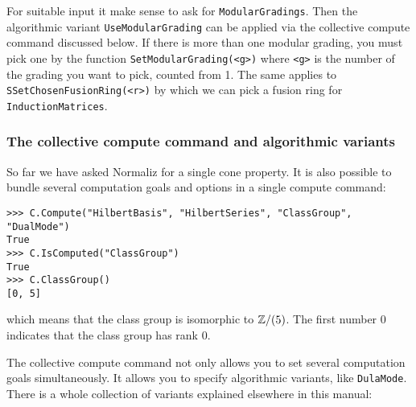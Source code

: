 \begin{small}
For suitable input it make sense to ask for \verb*|ModularGradings|. Then the algorithmic variant \verb*|UseModularGrading| can be applied via the collective compute command discussed below. If there is more than one modular grading, you must pick one by the function \verb*|SetModularGrading(<g>)| where  \verb*|<g>| is the number of the grading you want to pick, counted from 1. The same applies to \verb*|SSetChosenFusionRing(<r>)| by which we can pick a fusion ring for \verb*|InductionMatrices|.

\subsubsection{The collective compute command and algorithmic variants}\label{CollComp}
So far we have asked Normaliz for a single cone property. It is also possible to bundle several computation goals and options in a single compute command:
\begin{Verbatim}
>>> C.Compute("HilbertBasis", "HilbertSeries", "ClassGroup", "DualMode")
True
>>> C.IsComputed("ClassGroup")
True
>>> C.ClassGroup()
[0, 5]
\end{Verbatim}
which means that the class group is isomorphic to ${\mathbb Z}/(5)$. The first number $0$ indicates that the class group has rank $0$.

The collective compute command not only allows you to set several computation goals simultaneously. It allows you to specify algorithmic variants, like \verb|DulaMode|. There is a whole collection of variants explained elsewhere in this manual:



\end{small}
